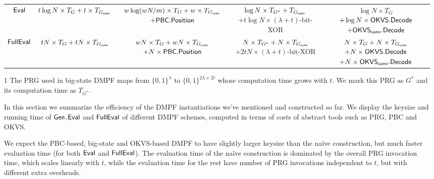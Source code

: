 \begin{table*}
\begin{threeparttable}
\begin{tabular}{ccccc}
	${\sf Eval}$ & $t\log N\times T_G+t\times T_{G_{\sf conv}}$ &\makecell{$w\log(wN/m)\times T_G + w\times T_{G_{\sf conv}}$\\$+{\sf PBC}.{\sf Position}$} & \makecell{$\log N\times T_{G^*} + T_{G_{\sf conv}}$\\$+t\log N \times (\lambda+t)$-bit-XOR}&\makecell{$\log N\times T_G$ \\$+\log N\times{\sf OKVS}.{\sf Decode}$\\ $+\OKVS_{\sf conv}.\Decode$} \\

        \cline{1-5}

	${\sf FullEval}$ & $tN\times T_G+tN\times T_{G_{\sf conv}}$ &\makecell{$wN\times T_G+ wN\times T_{G_{\sf conv}}$\\$+N\times{\sf PBC}.{\sf Position}$} & \makecell{$N\times T_{G^*} + N\times T_{G_{\sf conv}}$\\$+2tN\times (\lambda+t)$-bit-XOR }& \makecell{$N\times T_G+N\times T_{G_{\sf conv}}$ \\  $+N\times{\sf OKVS}.{\sf Decode}$\\$+N\times {\sf OKVS}_{\sf conv}.{\sf Decode}$} \\
        \bottomrule
			\end{tabular}	
      \begin{tablenotes}
        \item [1] The PRG used in big-state DMPF maps from $\{0,1\}^\lambda$ to $\{0,1\}^{2\lambda+2t}$ whose computation time grows with $t$. We mark this PRG as $G^*$ and its computation time as $T_{G^*}$. 
        \end{tablenotes}
    \end{threeparttable}
	\end{table*}

In this section we summarize the efficiency of the DMPF instantiations we've mentioned and constructed so far. We display the keysize and running time of ${\sf Gen}$,${\sf Eval}$ and ${\sf FullEval}$ of different DMPF schemes, computed in terms of costs of abstract tools such as PRG, PBC and OKVS. 


We expect the PBC-based, big-state and OKVS-based DMPF to have slightly larger keysize than the na\"ive construction, but much faster evaluation time (for both ${\sf Eval}$ and ${\sf FullEval}$). The evaluation time of the na\"ive construction is dominated by the overall PRG invocation time, which scales linearly with $t$, while the evaluation time for the rest have number of PRG invocations independent to $t$, but with different extra overheads. 

